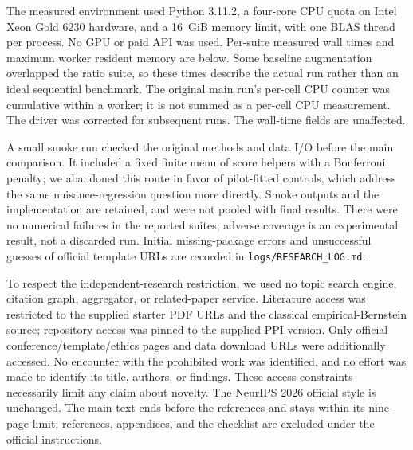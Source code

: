 \documentclass{article}
\begin{document}
The measured environment used Python 3.11.2, a four-core CPU quota on Intel Xeon Gold 6230 hardware, and a 16~GiB memory limit, with one BLAS thread per process. No GPU or paid API was used. Per-suite measured wall times and maximum worker resident memory are below. Some baseline augmentation overlapped the ratio suite, so these times describe the actual run rather than an ideal sequential benchmark. The original main run's per-cell CPU counter was cumulative within a worker; it is not summed as a per-cell CPU measurement. The driver was corrected for subsequent runs. The wall-time fields are unaffected.
\begin{table}[h]
 \centering\caption{Measured main scientific runs; setup, PDF compilation, smoke tests, and baseline augmentation are additional small tasks recorded in \texttt{logs/}. The maximum RSS is for one worker, not the sum across workers.}
 \resizebox{\linewidth}{!}{}
\end{table}

A small smoke run checked the original methods and data I/O before the main comparison. It included a fixed finite menu of score helpers with a Bonferroni penalty; we abandoned this route in favor of pilot-fitted controls, which address the same nuisance-regression question more directly. Smoke outputs and the implementation are retained, and were not pooled with final results. There were no numerical failures in the reported suites; adverse coverage is an experimental result, not a discarded run. Initial missing-package errors and unsuccessful guesses of official template URLs are recorded in \texttt{logs/RESEARCH\_LOG.md}.

To respect the independent-research restriction, we used no topic search engine, citation graph, aggregator, or related-paper service. Literature access was restricted to the supplied starter PDF URLs and the classical empirical-Bernstein source; repository access was pinned to the supplied PPI version. Only official conference/template/ethics pages and data download URLs were additionally accessed. No encounter with the prohibited work was identified, and no effort was made to identify its title, authors, or findings. These access constraints necessarily limit any claim about novelty. The NeurIPS 2026 official style is unchanged. The main text ends before the references and stays within its nine-page limit; references, appendices, and the checklist are excluded under the official instructions.

\clearpage

\end{document}
